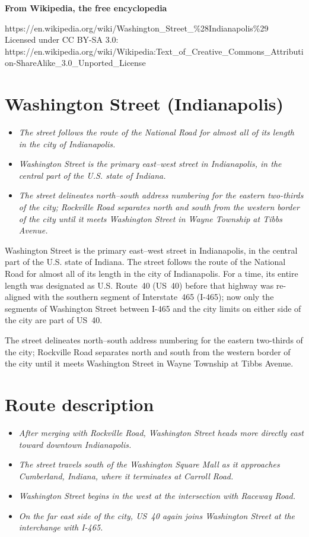\textbf{From Wikipedia, the free encyclopedia}

https://en.wikipedia.org/wiki/Washington\_Street\_\%28Indianapolis\%29\\
Licensed under CC BY-SA 3.0:\\
https://en.wikipedia.org/wiki/Wikipedia:Text\_of\_Creative\_Commons\_Attribution-ShareAlike\_3.0\_Unported\_License

\section{Washington Street
(Indianapolis)}\label{washington-street-indianapolis}

\begin{itemize}
\item
  \emph{The street follows the route of the National Road for almost all
  of its length in the city of Indianapolis.}
\item
  \emph{Washington Street is the primary east--west street in
  Indianapolis, in the central part of the U.S. state of Indiana.}
\item
  \emph{The street delineates north--south address numbering for the
  eastern two-thirds of the city; Rockville Road separates north and
  south from the western border of the city until it meets Washington
  Street in Wayne Township at Tibbs Avenue.}
\end{itemize}

Washington Street is the primary east--west street in Indianapolis, in
the central part of the U.S. state of Indiana. The street follows the
route of the National Road for almost all of its length in the city of
Indianapolis. For a time, its entire length was designated as U.S.
Route~40 (US~40) before that highway was re-aligned with the southern
segment of Interstate~465 (I-465); now only the segments of Washington
Street between I-465 and the city limits on either side of the city are
part of US~40.

The street delineates north--south address numbering for the eastern
two-thirds of the city; Rockville Road separates north and south from
the western border of the city until it meets Washington Street in Wayne
Township at Tibbs Avenue.

\section{Route description}\label{route-description}

\begin{itemize}
\item
  \emph{After merging with Rockville Road, Washington Street heads more
  directly east toward downtown Indianapolis.}
\item
  \emph{The street travels south of the Washington Square Mall as it
  approaches Cumberland, Indiana, where it terminates at Carroll Road.}
\item
  \emph{Washington Street begins in the west at the intersection with
  Raceway Road.}
\item
  \emph{On the far east side of the city, US~40 again joins Washington
  Street at the interchange with I-465.}
\end{itemize}

